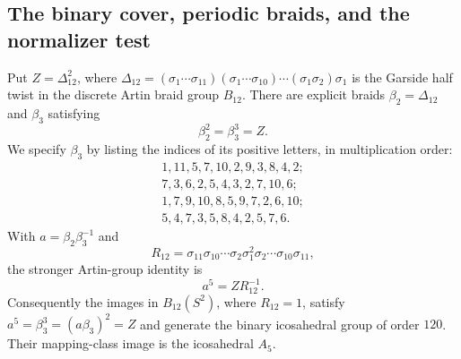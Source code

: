 \subsection*{The binary cover, periodic braids, and the normalizer test}

Put \(Z=\Delta_{12}^{2}\), where
\(\Delta_{12}=(\sigma_1\cdots\sigma_{11})(\sigma_1\cdots\sigma_{10})
\cdots(\sigma_1\sigma_2)\sigma_1\) is the Garside half twist in the
discrete Artin braid group \(B_{12}\). There are explicit braids
\(\beta_2=\Delta_{12}\) and \(\beta_3\) satisfying
\[
 \beta_2^2=\beta_3^3=Z.
\]
We specify \(\beta_3\) by listing the indices of its positive letters,
in multiplication order:
\[
\begin{gathered}
1,11,5,7,10,2,9,3,8,4,2;\\
7,3,6,2,5,4,3,2,7,10,6;\\
1,7,9,10,8,5,9,7,2,6,10;\\
5,4,7,3,5,8,4,2,5,7,6.
\end{gathered}
\]
With \(a=\beta_2\beta_3^{-1}\) and
\[
 R_{12}=\sigma_{11}\sigma_{10}\cdots\sigma_2\sigma_1^2
              \sigma_2\cdots\sigma_{10}\sigma_{11},
\]
the stronger Artin-group identity is
\[
 a^5=Z R_{12}^{-1}.
\]
Consequently the images in \(B_{12}(S^2)\), where \(R_{12}=1\),
satisfy \(a^5=\beta_3^3=(a\beta_3)^2=Z\) and generate the binary
icosahedral group of order \(120\). Their mapping-class image is
the icosahedral \(A_5\).
